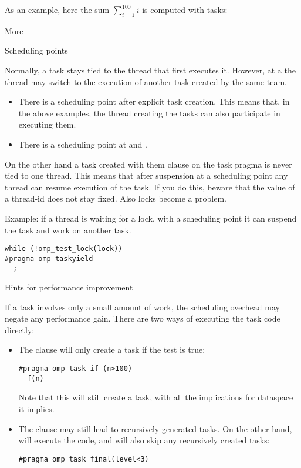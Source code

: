 As an example, here the sum $\sum_{i=1}^{100} i$ is computed with tasks:
%

 {More}

 {Scheduling points}

Normally, a task stays tied to the thread that first executes it.
However, at a  the thread may
switch to the execution of another task created by the same team.
\begin{itemize}
\item There is a scheduling point after explicit task creation. This
  means that, in the above examples, the thread creating the tasks can
  also participate in executing them.
\item There is a scheduling point at  and .
\end{itemize}

On the other hand a task created with them  clause
on the task pragma is never tied to one thread. This means that after
suspension at a scheduling point any thread can resume execution of
the task.
If you do this, beware
that the value of a thread-id does not stay fixed. Also locks become a problem.

Example: if a thread is waiting for a lock, with a scheduling point it
can suspend the task and work on another task.
\begin{lstlisting}
while (!omp_test_lock(lock))
#pragma omp taskyield
  ;
\end{lstlisting}

 {Hints for performance improvement}
\label{sec:omp-task-hint}

If a task involves only a small amount of work,
the scheduling overhead may negate any performance gain.
There are two ways of executing the task code directly:
\begin{itemize}
\item The  clause will only create a task
  if the test is true:
\begin{lstlisting}
#pragma omp task if (n>100)
  f(n)
\end{lstlisting}
Note that this will still create a task, with
all the implications for dataspace it implies.
\item The  clause may still lead to recursively
  generated tasks. On the other hand, 
  will execute the code, and will also skip any recursively created tasks:
\begin{lstlisting}
#pragma omp task final(level<3)
\end{lstlisting}
\end{itemize}

